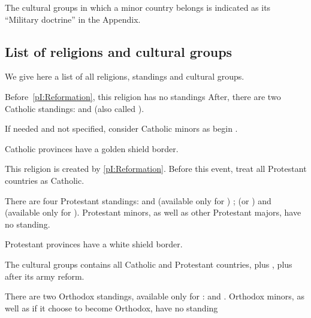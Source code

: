 \aparag The cultural groups in which a minor country belongs is indicated as
its ``Military doctrine'' in the Appendix.



\subsection{List of religions and cultural groups}

\label{chThePowers:List of religions}
\aparag We give here a list of all religions, standings and cultural groups.


\aparag Before~\ref{pI:Reformation}, this religion has no standings
\bparag After, there are two Catholic standings:  and
 (also called ).

\bparag If needed and not specified, consider Catholic minors as begin
\CATHCR.

\aparag Catholic provinces have a golden shield border.

\aparag This religion is created by \ref{pI:Reformation}.
\bparag Before this event, treat all Protestant countries as Catholic.

%
\aparag There are four Protestant standings:  and
 (available only for \ANG) ;  (or
) and  (available only for \SUE).
\bparag Protestant minors, as well as other Protestant majors, have no
standing.

\aparag Protestant provinces have a white shield border.

\aparag The  cultural groups contains all Catholic and Protestant
countries, plus \POL, plus \RUS after its army reform.

\aparag There are two Orthodox standings, available only for \RUS:
 and .
\bparag Orthodox minors, as well as \POL if it choose to become Orthodox, have
no standing

